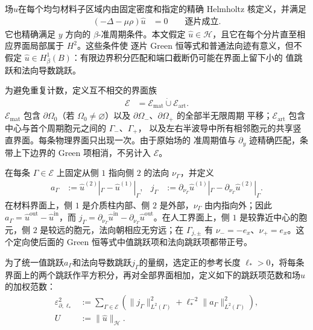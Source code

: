 场$\widehat{u}$在每个均匀材料子区域内由固定密度和指定的精确 Helmholtz 核定义，并满足
\begin{align}
  (-\Delta-\mu\rho)\widehat{u}&=0
  \qquad\text{逐片成立}.
  \label{eq:raw-piecewise-pde}
\end{align}
它也精确满足 $y$ 方向的 $\beta$-准周期条件。本文假定
$\widehat{u}\in\mathcal H$，且它在每个分片直至相应界面局部属于 $H^2$。这些条件使
逐片 Green 恒等式和普通法向迹有意义，但不假定
$\widehat{u}\in H^1_\beta(B)$：有限边界积分匹配和端口截断仍可能在界面上留下小的
值跳跃和法向导数跳跃。

为避免重复计数，定义互不相交的界面族
\begin{align}
  \mathscr E&=\mathscr E_{\mathrm{mat}}\mathbin{\dot\cup}
  \mathscr E_{\mathrm{art}}.
  \label{eq:certification-interface-family}
\end{align}
$\mathscr E_{\mathrm{mat}}$ 包含 $\partial\Omega_0$（若
$\Omega_0\ne\varnothing$）以及 $\partial\Omega_-$、$\partial\Omega_+$ 的全部半无限周期
平移；$\mathscr E_{\mathrm{art}}$ 包含中心与首个周期胞元之间的 $\Gamma_-$、$\Gamma_+$，
以及左右半波导中所有相邻胞元的共享竖直界面。每条物理界面只出现一次。由于原始场的
准周期值与 $\partial_y$ 迹精确匹配，条带上下边界的 Green 项相消，不另计入
$\mathscr E$。

在每条 $\Gamma\in\mathscr E$ 上固定从侧 $1$ 指向侧 $2$ 的法向 $\nu_\Gamma$，并定义
\begin{align}
  a_\Gamma
  &:=\widehat{u}^{(2)}|_\Gamma
    -\widehat{u}^{(1)}|_\Gamma,
  &j_\Gamma
  &:=\partial_{\nu_\Gamma}\widehat{u}^{(1)}|_\Gamma
    -\partial_{\nu_\Gamma}\widehat{u}^{(2)}|_\Gamma.
  \label{eq:raw-interface-jumps}
\end{align}
在材料界面上，侧 $1$ 是介质柱内部、侧 $2$ 是外部，$\nu_\Gamma$ 由内指向外；因此
$a_\Gamma=\widehat{u}^{\mathrm{out}}-\widehat{u}^{\mathrm{in}}$，而
$j_\Gamma=\partial_{\nu_\Gamma}\widehat{u}^{\mathrm{in}}
-\partial_{\nu_\Gamma}\widehat{u}^{\mathrm{out}}$。在人工界面上，侧 $1$ 是较靠近中心的胞元，侧
$2$ 是较远的胞元，法向朝相应无穷远；在 $\Gamma_{j,\pm}$ 有
$\nu_-=-e_x$、$\nu_+=e_x$。这个定向使后面的 Green 恒等式中值跳跃项和法向跳跃项都带正号。

为了统一值跳跃$a_\Gamma$和法向导数跳跃$j_\Gamma$的量纲，选定正的参考长度 $\ell_*>0$，将每条界面上的两个跳跃作平方积分，再对全部界面相加，定义如下的跳跃项范数和场$\widehat{u}$的加权范数：
\begin{align}
  \varepsilon_{\partial,\ell_*}^2
  &:={}
  \sum_{\Gamma\in\mathscr E}
  \left(
    \lVert j_\Gamma\rVert_{L^2(\Gamma)}^2
    +\ell_*^{-2}\lVert a_\Gamma\rVert_{L^2(\Gamma)}^2
  \right),
  \label{eq:boundary-defect-norm}\\
  U&:=\lVert \widehat{u}\rVert_{\mathcal H}.
  \label{eq:raw-field-mass}
\end{align}

